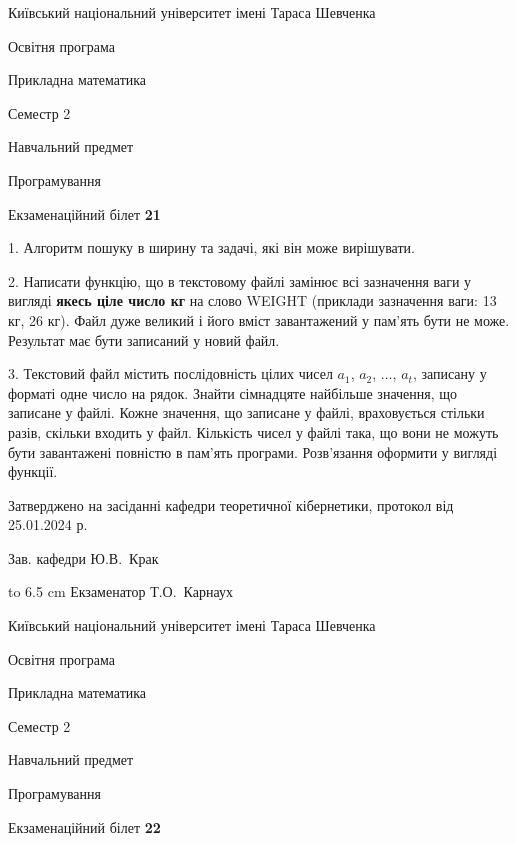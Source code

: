 \documentclass[12pt, ukrainian]{article}
\begin{document}
\vspace{0.9cm}
{{\begin {scriptsize}\par
{ \center  Київський національний університет імені Тараса Шевченка \par}
{\parbox {5 cm}{Освітня програма \hfill}{\parbox {7 cm}{Прикладна математика\hfill}}\parbox {6 cm}{\hfill Семестр 2}}\par
{\parbox {5 cm} {Навчальний предмет \hfill}\parbox {7 cm}{Програмування \hfill}\parbox {6cm}{\hfill}\par}\vspace{-15pt} \end{scriptsize}}{\center Екзаменаційний білет \No \textbf { 21 }\par}}
{%
1. Алгоритм пошуку в ширину та задачі, які він може вирішувати.%
\par
2. Написати функцію, що в текстовому файлі замінює всі зазначення ваги у вигляді \textbf{якесь ціле число кг} на слово WEIGHT (приклади зазначення ваги: 13 кг, 26   кг). Файл дуже великий і його вміст завантажений у пам'ять бути не може. Результат має бути записаний у новий файл.

\par
3. Текстовий файл містить послідовність цілих чисел $a_1$, $a_2$, $\ldots$, $a_t$, записану у форматі одне число на рядок. Знайти сімнадцяте найбільше значення, що записане у файлі. Кожне значення, що записане у файлі, враховується стільки разів, скільки входить у файл. Кількість чисел у файлі така, що вони не можуть бути завантажені повністю в пам'ять програми. Розв'язання оформити у вигляді функції.

}
{\smallskip\smallskip \begin {scriptsize} Затверджено на засіданні кафедри теоретичної кібернетики, протокол   від   25.01.2024 р.\par\smallskip\smallskip\smallskip\smallskip
{\parbox {6.5 cm} {Зав. кафедри \dotfill Ю.В.~Крак}}\hspace {0.7cm} {\hbox to 6.5 cm { Екзаменатор \dotfill Т.О.~Карнаух}} \end{scriptsize}}
\newpage
{{\begin {scriptsize}\par
{ \center  Київський національний університет імені Тараса Шевченка \par}
{\parbox {5 cm}{Освітня програма \hfill}{\parbox {7 cm}{Прикладна математика\hfill}}\parbox {6 cm}{\hfill Семестр 2}}\par
{\parbox {5 cm} {Навчальний предмет \hfill}\parbox {7 cm}{Програмування \hfill}\parbox {6cm}{\hfill}\par}\vspace{-15pt} \end{scriptsize}}{\center Екзаменаційний білет \No \textbf { 22 }\par}}
\end{document}
